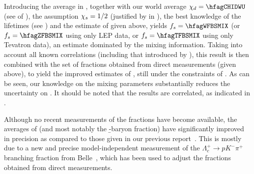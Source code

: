 Introducing the \chibar average in , together with our world average 
$\chid = \hfagCHIDWU$ (see  of ), the assumption $\chi_{s}= 1/2$ 
(justified by  in ), the 
best knowledge of the lifetimes (see ) and the estimate of \fbb given above, 
yields $\fBs = \hfagWFBSMIX$ 
(or $\fBs = \hfagZFBSMIX$ using only LEP data, 
or $\fBs = \hfagTFBSMIX$ using only Tevatron data),
an estimate dominated by the mixing information. 
Taking into account all known correlations (including that introduced by \fbb), 
this result is then combined with the set of fractions obtained from direct measurements 
(given above), to yield the %
improved estimates of , 
still under the constraints of .
As can be seen, our knowledge on the mixing parameters 
substantially reduces the uncertainty on \fBs.
It should be noted that the results %
are correlated, as indicated in .

Although no recent measurements of the fractions have become available, 
the averages of  (and most notably the \b-baryon fraction) 
have significantly improved in precision as compared to those given in our 
previous report~\cite{Amhis:2012bh}. This is mostly due to a new and precise 
model-independent measurement of the $\Lambda_c^+ \to p K^-\pi^+$
branching fraction from Belle~\cite{Zupanc:2013iki}, 
which has been used to adjust the fractions obtained from direct measurements. 




